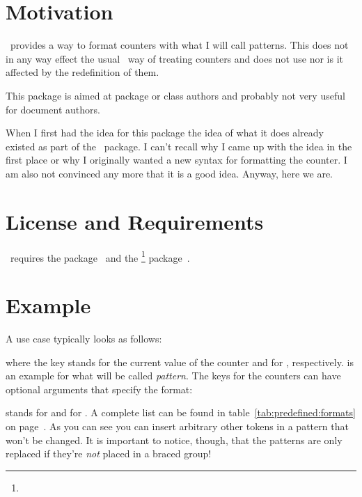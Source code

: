 \documentclass[load-preamble+]{cnltx-doc}
\begin{document}
\section{Motivation}
\cntformats\ provides a way to format counters with what I will call patterns.
This does not in any way effect the usual \LaTeXe\ way of treating counters
and does not use  nor is it affected by the redefinition of
them.

This package is aimed at package or class authors and probably not very useful
for document authors.

When I first had the idea for this package the idea of what it does already
existed as part of the \ExSheets\ package.  I can't recall why I came up with
the idea in the first place or why I originally wanted a new syntax for
formatting the  counter.  I am also not convinced any more that
it is a good idea.  Anyway, here we are.

\section{License and Requirements}\label{sec:license}
\license

\cntformats\ requires the  package~\cite{pkg:etoolbox}
and the \footnote{} package~\cite{bnd:cnltx}.

\section{Example}
A use case typically looks as follows:
\begin{example}
\end{example}
where the key  stands for the current value of the 
counter and  for , respectively.  is
an example for what will be called \emph{pattern}. The keys for the counters
can have optional arguments that specify the format:
\begin{example}
\end{example}
 stands for  and  for .  A complete list
can be found in table~\ref{tab:predefined:formats} on
page~\pageref{tab:predefined:formats}.  As you can see you can insert
arbitrary other tokens in a pattern that won't be changed. It is important to
notice, though, that the patterns are only replaced if they're \emph{not}
placed in a braced group!
\end{document}

